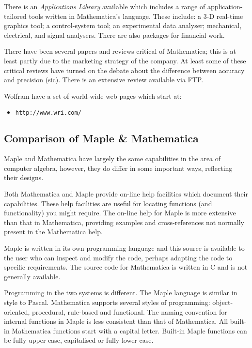 \documentclass[twoside,11pt]{article}
\newcommand{\htmladdnormallink}[2]{#1}
\begin{document}
There is an {\sl Applications Library} available which includes a range of
application-tailored tools written in Mathematica's language.  These include:
a 3-D real-time graphics tool; a control-system tool; an experimental data
analyser; mechanical, electrical, and signal analysers.  There are also
packages for financial work.

There have been several papers and reviews critical of Mathematica; this
is at least partly due to the marketing strategy of the company.  At least
some of these critical reviews have turned on the debate about the difference
between accuracy and precision (sic).  There is an extensive
review available via FTP\cite{fateman}\@.

Wolfram have a set of world-wide web pages which start at:

\begin{itemize}

\item \htmladdnormallink{{\tt http://www.wri.com/}}{http://www.wri.com/}

\end{itemize}


\subsection{Comparison of Maple \& Mathematica}

Maple and Mathematica have largely the same capabilities in the area
of computer algebra, however, they do differ in some important ways,
reflecting their designs.

Both Mathematica and Maple provide on-line help facilities which document
their capabilities.  These help facilities are useful for locating
functions (and functionality) you might require.  The on-line help for
Maple is more extensive than that in Mathematica, providing examples and
cross-references not normally present in the Mathematica help.

Maple is written in its own programming language and this source is
available to the user who can inspect and modify the code, perhaps
adapting the code to specific requirements.  The source code for
Mathematica is written in C and is not generally available.

Programming in the two systems is different.  The Maple language is
similar in style to Pascal.
Mathematica supports several styles of programming:
object-oriented, procedural, rule-based and functional.
The naming convention for internal functions in Maple is less consistent
than that of Mathematica.
All built-in Mathematica functions start with a capital letter.
Built-in Maple functions can be fully upper-case, capitalised or fully
lower-case.
\end{document}
